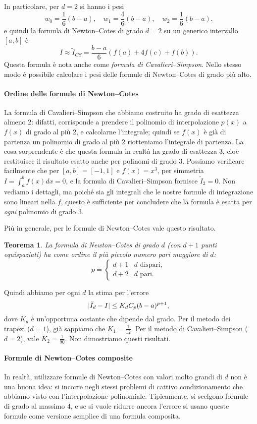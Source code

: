 \documentclass[a4paper]{report}
\DeclarePairedDelimiter{\abs}{\lvert}{\rvert}
\newtheorem{theorem}{Teorema}[chapter]
\theoremstyle{definiton}
\theoremstyle{remark}
\begin{document}
In particolare, per $d=2$ si hanno i pesi
\[
w_0 = \frac16(b-a), \quad w_1 = \frac46 (b-a), \quad w_2 = \frac16 (b-a).
\]
e quindi la formula di Newton--Cotes di grado $d=2$ su un generico intervallo $[a,b]$ è
\[
I \approx \tilde{I}_{CS} = \frac{b-a}{6}\left(f(a) + 4f(c) + f(b)\right).
\]
Questa formula è nota anche come \emph{formula di Cavalieri--Simpson}. Nello stesso modo è possibile calcolare i pesi delle formule di Newton--Cotes di grado più alto.

\paragraph{Ordine delle formule di Newton--Cotes}

La formula di Cavalieri--Simpson che abbiamo costruito ha grado di esattezza almeno 2: difatti, corrisponde a prendere il polinomio di interpolazione $p(x)$ a $f(x)$ di grado al più 2, e calcolarne l'integrale; quindi se $f(x)$ è già di partenza un polinomio di grado al più $2$ riotteniamo l'integrale di partenza. La cosa sorprendente è che questa formula in realtà ha grado di esattezza 3, cioè restituisce il risultato esatto anche per polinomi di grado $3$. Possiamo verificare facilmente che per $[a,b]=[-1,1]$ e $f(x)=x^3$, per simmetria $I = \int_{a}^b f(x) dx = 0$, e la  formula di Cavalieri--Simpson fornisce $\tilde{I}_2=0$. Non vediamo i dettagli, ma poiché sia gli integrali che le nostre formule di integrazione sono lineari nella $f$, questo è sufficiente per concludere che la formula è esatta per \emph{ogni} polinomio di grado 3.

Più in generale, per le formule di Newton--Cotes vale questo risultato.
\begin{theorem}
La formula di Newton--Cotes di grado $d$ (con $d+1$ punti equispaziati) ha come ordine il più piccolo numero pari maggiore di $d$:
\[
p = \begin{cases}
    d+1 & \text{$d$ dispari},\\
    d+2 & \text{$d$ pari}.
\end{cases}
\]
\end{theorem}
Quindi abbiamo per ogni $d$ la stima per l'errore
\[
\abs{\tilde{I}_d - I} \leq K_d C_{p} (b-a)^{p+1},
\]
dove $K_d$ è un'opportuna costante che dipende dal grado. Per il metodo dei trapezi ($d=1$), già sappiamo che $K_1 = \frac{1}{12}$. Per il metodo di Cavalieri--Simpson ($d=2$), vale $K_2 = \frac{1}{90}$. Non dimostriamo questi risultati.

\paragraph{Formule di Newton--Cotes composite}
In realtà, utilizzare formule di Newton--Cotes con valori molto grandi di $d$ non è una buona idea: si incorre negli stessi problemi di cattivo condizionamento che abbiamo visto con l'interpolazione polinomiale. Tipicamente, si scelgono formule di grado al massimo 4, e se si vuole ridurre ancora l'errore si usano queste formule come versione semplice di una formula composita.
\end{document}

